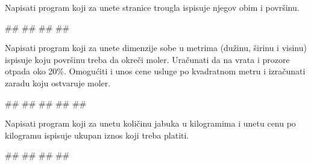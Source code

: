 \begin{Exercise}[label=p1_03] 
Napisati program koji za unete stranice trougla ispisuje njegov obim i površinu.\\
\begin{miditest}
\begin{upotreba}{1}
#\naslovInt#
##
##
##
\end{upotreba}
\end{miditest}
\end{Exercise}
\begin{Answer}[ref=p1_03]
\end{Answer}


\begin{Exercise}[label=p1_04] 
Napisati program koji za unete dimenzije sobe u metrima (dužinu, širinu i visinu) ispisuje koju površinu treba da okreči moler. Uračunati da na vrata i prozore otpada oko 20\%. Omogućiti i unos cene usluge po kvadratnom metru i izračunati zaradu koju ostvaruje moler.\\
\begin{miditest}
\begin{upotreba}{1}
#\naslovInt#
##
##
##
##
\end{upotreba}
\end{miditest}
\end{Exercise}
\begin{Answer}[ref=p1_04]
\end{Answer}



\begin{Exercise}[label=p1_05] 
Napisati program koji za unetu količinu jabuka u kilogramima i unetu cenu po kilogramu ispisuje ukupan iznos koji treba platiti.\\
\begin{miditest}
\begin{upotreba}{1}
#\naslovInt#
##
##
##
\end{upotreba}
\end{miditest}
\end{Exercise}
\begin{Answer}[ref=p1_05]
\end{Answer}


